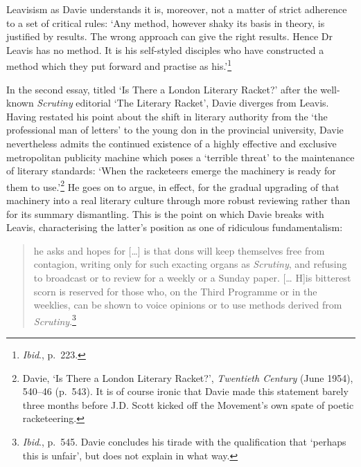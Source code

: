 \documentclass[]{article}
\begin{document}
\noindent Leavisism as Davie understands it is, moreover, not a matter
of strict adherence to a set of critical rules: ‘Any method, however
shaky its basis in theory, is justified by results. The wrong approach
can give the right results. Hence Dr Leavis has no method. It is his
self-styled disciples who have constructed a method which they put
forward and practise as his.’\footnote{\emph{Ibid}., p.~223.}

In the second essay, titled ‘Is There a London Literary Racket?’ after
the well-known \emph{Scrutiny} editorial ‘The Literary Racket’, Davie
diverges from Leavis. Having restated his point about the shift in
literary authority from the ‘the professional man of letters’ to the
young don in the provincial university, Davie nevertheless admits the
continued existence of a highly effective and exclusive metropolitan
publicity machine which poses a ‘terrible threat’ to the maintenance of
literary standards: ‘When the racketeers emerge the machinery is ready
for them to use.’\footnote{Davie, ‘Is There a London Literary Racket?’,
  \emph{Twentieth Century} (June 1954), 540–46 (p.~543). It is of course
  ironic that Davie made this statement barely three months before J.D.
  Scott kicked off the Movement’s own spate of poetic racketeering.} He
goes on to argue, in effect, for the gradual upgrading of that machinery
into a real literary culture through more robust reviewing rather than
for its summary dismantling. This is the point on which Davie breaks
with Leavis, characterising the latter’s position as one of ridiculous
fundamentalism:

\begin{quote}
\singlespacing [What] he asks and hopes for {[}\ldots{}{]} is that dons
will keep themselves free from contagion, writing only for such exacting
organs as \emph{Scrutiny}, and refusing to broadcast or to review for a
weekly or a Sunday paper. {[}\ldots{} H{]}is bitterest scorn is reserved
for those who, on the Third Programme or in the weeklies, can be shown
to voice opinions or to use methods derived from
\emph{Scrutiny}.\footnote{\emph{Ibid}., p.~545. Davie concludes his
  tirade with the qualification that ‘perhaps this is unfair’, but does
  not explain in what way.}
\end{quote}
\end{document}
